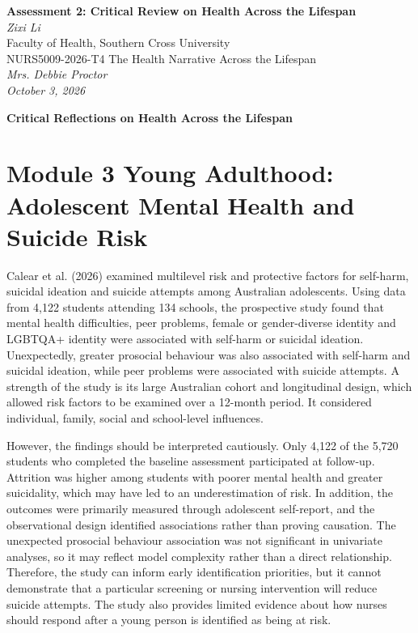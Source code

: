 \documentclass[12pt,a4paper]{article}
\begin{document}
\begin{titlepage}
\thispagestyle{plain}
\begin{center}
\vspace*{1.5in}
\textbf{Assessment 2: Critical Review on Health Across the Lifespan}\\
\vspace{1.5em}
\textit{Zixi Li}\\
Faculty of Health, Southern Cross University\\
NURS5009-2026-T4 The Health Narrative Across the Lifespan\\
\textit{Mrs. Debbie Proctor}\\
\textit{October 3, 2026}
\end{center}
\end{titlepage}

\setcounter{page}{2}
\begin{center}
\textbf{Critical Reflections on Health Across the Lifespan}
\end{center}

\section*{Module 3 Young Adulthood: Adolescent Mental Health and Suicide Risk}

Calear et al. (2026) examined multilevel risk and protective factors for self-harm, suicidal ideation and suicide attempts among Australian adolescents. Using data from 4,122 students attending 134 schools, the prospective study found that mental health difficulties, peer problems, female or gender-diverse identity and LGBTQA+ identity were associated with self-harm or suicidal ideation. Unexpectedly, greater prosocial behaviour was also associated with self-harm and suicidal ideation, while peer problems were associated with suicide attempts. A strength of the study is its large Australian cohort and longitudinal design, which allowed risk factors to be examined over a 12-month period. It considered individual, family, social and school-level influences.

However, the findings should be interpreted cautiously. Only 4,122 of the 5,720 students who completed the baseline assessment participated at follow-up. Attrition was higher among students with poorer mental health and greater suicidality, which may have led to an underestimation of risk. In addition, the outcomes were primarily measured through adolescent self-report, and the observational design identified associations rather than proving causation. The unexpected prosocial behaviour association was not significant in univariate analyses, so it may reflect model complexity rather than a direct relationship. Therefore, the study can inform early identification priorities, but it cannot demonstrate that a particular screening or nursing intervention will reduce suicide attempts. The study also provides limited evidence about how nurses should respond after a young person is identified as being at risk.
\end{document}
